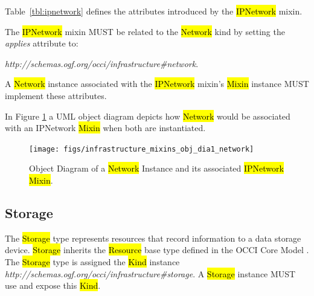 \documentclass[10pt,a4paper]{article}
\begin{document}
Table~\ref{tbl:ipnetwork} defines the attributes introduced by the
\hl{IPNetwork} mixin.

The \hl{IPNetwork} mixin MUST be related to the \hl{Network} kind
by setting the \textit{applies} attribute to:

\textit{http://schemas.ogf.org/occi/infrastructure\#network}.

A \hl{Network} instance associated with the
\hl{IPNetwork} mixin's \hl{Mixin} instance MUST implement these
attributes.


In Figure \ref{fig:network_mixin} a UML object diagram depicts how
\hl{Network} would be associated with an IPNetwork \hl{Mixin} when
both are instantiated.

\begin{figure}[!h]
	\centering
	\texttt{[image: figs/infrastructure\_mixins\_obj\_dia1\_network]}
	\caption{Object Diagram of a \hl{Network} Instance and its
	associated \hl{IPNetwork} \hl{Mixin}.}
	\label{fig:network_mixin}
\end{figure}

\subsection{Storage}
The \hl{Storage} type represents resources that record information to a
data storage device.  \hl{Storage} inherits the \hl{Resource} base
type defined in the OCCI Core Model \cite{occi:core}.  The
\hl{Storage} type is assigned the \hl{Kind} instance
\textit{http://schemas.ogf.org/occi/infrastructure\#storage}.  A
\hl{Storage} instance MUST use and expose this \hl{Kind}.
\end{document}
